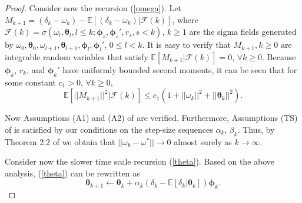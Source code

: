 \begin{proof}
    
    Consider now the recursion (\ref{omega}).
    Let
    $M_{k+1}=(\delta_k-\omega_k)
    -\mathbb{E}[(\delta_k-\omega_k)|\mathcal{F}(k)]$,
    where $\mathcal{F}(k)=\sigma(\omega_l,\bm{\bm{\theta}}_l,l\leq k;\bm{\bm{\phi}}_s,\bm{\bm{\phi}}_s',r_s,s<k)$, 
    $k\geq 1$ are the sigma fields
    generated by $\omega_0,\bm{\bm{\theta}}_0,\omega_{l+1},\bm{\bm{\theta}}_{l+1},\bm{\bm{\phi}}_l,\bm{\bm{\phi}}_l'$,
    $0\leq l<k$.
    It is easy to verify that $M_{k+1},k\geq0$ are integrable random variables that 
    satisfy $\mathbb{E}[M_{k+1}|\mathcal{F}(k)]=0$, $\forall k\geq0$.
    Because $\bm{\bm{\phi}}_k$, $r_k$, and $\bm{\bm{\phi}}_k'$   have
    uniformly bounded second moments, it can be seen that for some constant
    $c_1>0$, $\forall k\geq0$,
    \begin{equation*}
    \mathbb{E}[||M_{k+1}||^2|\mathcal{F}(k)]\leq
    c_1(1+||\omega_k||^2+||\bm{\bm{\theta}}_k||^2).
    \end{equation*}
    
    
    Now Assumptions (A1) and (A2) of \cite{borkar2000ode} are verified.
    Furthermore, Assumptions (TS) of \cite{borkar2000ode} is satisfied by our
    conditions on the step-size sequences $\alpha_k$, $\beta_k$. Thus,
    by Theorem 2.2 of \cite{borkar2000ode} we obtain that
    $||\omega_k-\omega^*||\rightarrow 0$ almost surely as $k\rightarrow \infty$.
    
    Consider now the slower time scale recursion (\ref{theta}).
    Based on the above analysis, (\ref{theta}) can be rewritten as 
    \begin{equation*}
    \bm{\bm{\theta}}_{k+1}\leftarrow
    \bm{\bm{\theta}}_{k}+\alpha_k(\delta_k-\mathbb{E}[\delta_k|\bm{\bm{\theta}}_k])\bm{\bm{\phi}}_k.
    \end{equation*}
    

\end{proof}
